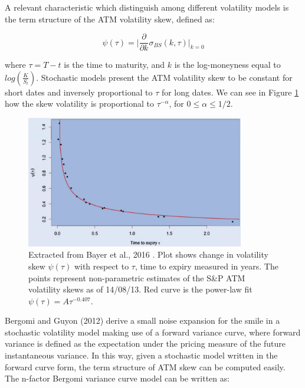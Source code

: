 \documentclass[12pt,oneside]{article}
\begin{document}
A relevant characteristic which distinguish among different volatility models is the term structure of the ATM volatility skew, defined as:

\begin{equation}
    \psi(\tau) = \Big| \frac{\partial}{\partial k} \sigma_{BS}(k,\tau) \Big|_{k = 0}
\end{equation}

where $\tau = T - t$ is the time to maturity, and $k$ is the log-moneyness equal to $log(\frac{K}{S_{t}})$. Stochastic models present the ATM volatility skew to be constant for short dates and inversely proportional to $\tau$ for long dates. We can see in Figure \ref{fig:Bayer2016_vol_skew} how the skew volatility is proportional to $\tau^{-\alpha}$, for $0\leq \alpha \leq 1/2$. 
\\

\begin{figure}[htpb]
    \centering
    \includegraphics[width=0.85\textwidth ]{figs/Bayer2016_fig2.png}
    \caption{Extracted from Bayer et al., 2016  \cite[Figure~2]{Bayer2016}. Plot shows change in volatility skew $\psi(\tau)$ with respect to $\tau$, time to expiry measured in years. The points represent non-parametric estimates of the S\&P ATM volatility skews as of 14/08/13. Red curve is the power-law fit $\psi(\tau) = A\tau^{-0.407}$.}
    \label{fig:Bayer2016_vol_skew}
\end{figure} 

Bergomi and Guyon (2012) derive a small noise expansion for the smile in a stochastic volatility model making use of a forward variance curve, where forward variance is defined as the expectation under the pricing measure of the future instantaneous variance. In this way, given a stochastic model written in the forward curve form, the term structure of ATM skew can be computed easily. The n-factor Bergomi variance curve model can be written as:
\end{document}
